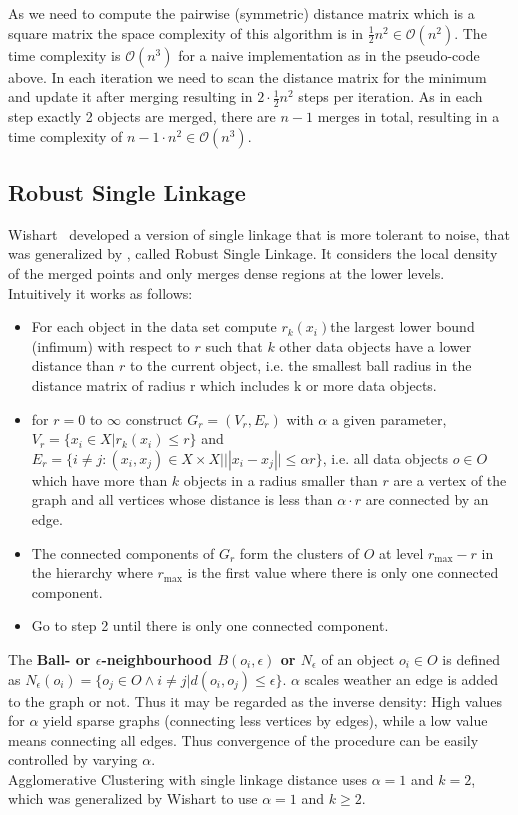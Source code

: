 As we need to compute the pairwise (symmetric) distance matrix which is a square matrix the space complexity of this algorithm is in $\frac{1}{2} n^2 \in \mathcal{O}(n^2)$. The time complexity is $\mathcal{O}(n^3)$ for a naive implementation as in the pseudo-code above. In each iteration we need to scan the distance matrix for the minimum and update it after merging resulting in  $2 \cdot \frac{1}{2} n^2$ steps per iteration. As in each step exactly 2 objects are merged, there are $n-1$ merges in total, resulting in a time complexity of $n - 1 \cdot n^2 \in \mathcal{O}(n^3)$.

\subsection{Robust Single Linkage}\label{\positionnumber}
Wishart~\cite{wishart1969256} developed a version of single linkage that is more tolerant to noise, that was generalized by \cite{Chaudhuri2010RatesOC}, called Robust Single Linkage. It considers the local density of the merged points and only merges dense regions at the lower levels. Intuitively it works as follows:
\begin{itemize}
    \item For each object in the data set compute $r_k(x_i) $the largest lower bound (infimum) with respect to $r$ such that $k$ other data objects have a lower distance than $r$ to the current object, i.e. the smallest ball radius in the distance matrix of radius r which includes k or more data objects.
    \item for $r=0$ to $\infty$ construct $G_r = (V_r, E_r)$ with $\alpha$ a given parameter, $V_r = \{x_i \in X | r_k(x_i) \leq r\}$ and $E_r = \{i \neq j: (x_i, x_j) \in X \times X | ||x_i - x_j|| \leq \alpha r\}$, i.e. all data objects $o \in O$ which have more than $k$ objects in a radius smaller than $r$ are a vertex of the graph and all vertices whose distance is less than $\alpha \cdot r$ are connected by an edge. 
    \item The connected components of $G_r$ form the clusters of $O$ at level $r_{\text{max}} - r$ in the hierarchy where $r_{\text{max}}$ is the first value where there is only one connected component.
    \item Go to step 2 until there is only one connected component.
\end{itemize}
 The \textbf{Ball- or $\epsilon$-neighbourhood $B(o_i, \epsilon)$ or $N_\epsilon$} of an object $o_i \in O$ is defined as $N_\epsilon(o_i) = \{o_j \in O \wedge i \neq j | d(o_i, o_j) \leq \epsilon \}$.
$\alpha$ scales weather an edge is added to the graph or not. Thus it may be regarded as the inverse density: High values for $\alpha$ yield sparse graphs (connecting less vertices by edges), while a low value means connecting all edges. Thus convergence of the procedure can be easily controlled by varying $\alpha$. \\
Agglomerative Clustering with single linkage distance uses $\alpha = 1$ and $k = 2$, which was generalized by Wishart to use $\alpha = 1$ and $k \geq 2$. \\

